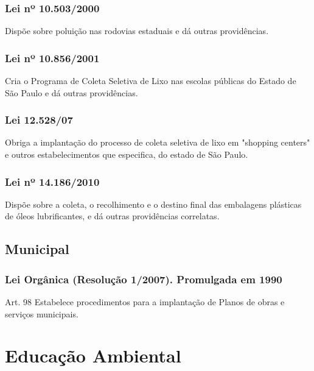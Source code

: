 \begin{subapend}
\begin{subsubapend}
		\subsubsection{Lei nº 10.503/2000}
		Dispõe sobre poluição nas rodovias estaduais e dá outras providências.
		\subsubsection{Lei nº 10.856/2001}
		Cria o Programa de Coleta Seletiva de Lixo nas escolas públicas do Estado de São Paulo e dá outras providências.
		\subsubsection{Lei 12.528/07}
		Obriga a implantação do processo de coleta seletiva de lixo em "shopping centers" e outros estabelecimentos que especifica, do estado de São Paulo.
		\subsubsection{Lei nº 14.186/2010}
		Dispõe sobre a coleta, o recolhimento e o destino final das embalagens plásticas de óleos lubrificantes, e dá outras providências correlatas.
	\end{subsubapend}
\end{subapend}

\begin{subapend}
	\subsection{Municipal}
	\begin{subsubapend}
		\subsubsection{Lei Orgânica (Resolução 1/2007). Promulgada em 1990}                               
		Art. 98
		Estabelece procedimentos para a implantação de Planos de obras e serviços municipais.
	\end{subsubapend}
\end{subapend}


                                
\section{Educação Ambiental}


